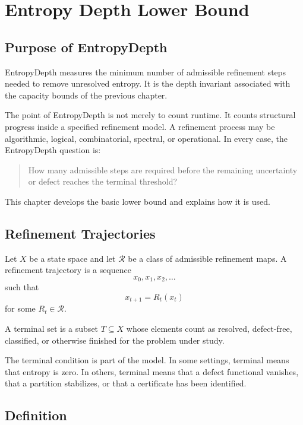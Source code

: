 \chapter{Entropy Depth Lower Bound}

\section{Purpose of EntropyDepth}

EntropyDepth measures the minimum number of admissible refinement steps needed
to remove unresolved entropy. It is the depth invariant associated with the
capacity bounds of the previous chapter.

The point of EntropyDepth is not merely to count runtime. It counts structural
progress inside a specified refinement model. A refinement process may be
algorithmic, logical, combinatorial, spectral, or operational. In every case,
the EntropyDepth question is:

\begin{quote}
How many admissible steps are required before the remaining uncertainty or
defect reaches the terminal threshold?
\end{quote}

This chapter develops the basic lower bound and explains how it is used.

\section{Refinement Trajectories}

Let \(X\) be a state space and let \(\mathcal R\) be a class of admissible
refinement maps. A refinement trajectory is a sequence
\[
x_0,x_1,x_2,\ldots
\]
such that
\[
x_{t+1}=R_t(x_t)
\]
for some \(R_t\in\mathcal R\).

\begin{definition}
A terminal set is a subset \(T\subseteq X\) whose elements count as resolved,
defect-free, classified, or otherwise finished for the problem under study.
\end{definition}

The terminal condition is part of the model. In some settings, terminal means
that entropy is zero. In others, terminal means that a defect functional
vanishes, that a partition stabilizes, or that a certificate has been
identified.

\section{Definition}


